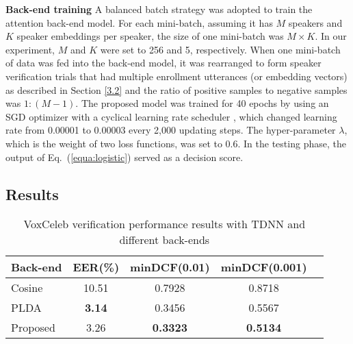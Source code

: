 \documentclass{article}
\begin{document}
\noindent
\textbf{Back-end training}
A balanced batch strategy was adopted to train the attention back-end model. For each mini-batch, assuming it has $M$ speakers and $K$ speaker embeddings per speaker, the size of one mini-batch was $M\times K$. In our experiment, $M$ and $K$ were set to 256 and 5, respectively. When one mini-batch of data was fed into the back-end model, it was rearranged to form speaker verification trials that had multiple enrollment utterances (or embedding vectors) as described in Section \ref{3.2} and the ratio of positive samples to negative samples was $1:(M-1)$. The proposed model was trained for 40 epochs by using an SGD optimizer with a cyclical learning rate scheduler \cite{cyclic}, which changed learning rate from 0.00001 to 0.00003 every 2,000 updating steps. The hyper-parameter $\lambda$, which is the weight of two loss functions, was set to 0.6. In the testing phase, the output of Eq.\ (\ref{equa:logistic}) served as a decision score.
\vspace{-1mm}




\subsection{Results}
\vspace{-1mm}

\begin{table}[t]
\vspace{-2mm}
\footnotesize
  \caption{VoxCeleb verification performance results with TDNN and different back-ends}
  \label{tab:result_vox}
  \vspace{1mm}
  \centering
  \begin{tabular}{lcccc}
    \toprule
    \textbf{Back-end} & \textbf{EER(\%)} & \textbf{minDCF(0.01)} & \textbf{minDCF(0.001)} \\
    \midrule
    Cosine     & 10.51              & 0.7928                & 0.8718                    \\
    PLDA       & \textbf{3.14}      & 0.3456                & 0.5567                    \\
    Proposed   & 3.26               & \textbf{0.3323}       & \textbf{0.5134}           \\
    \bottomrule
  \end{tabular}
  \vspace{-5mm}
\end{table}
\end{document}
